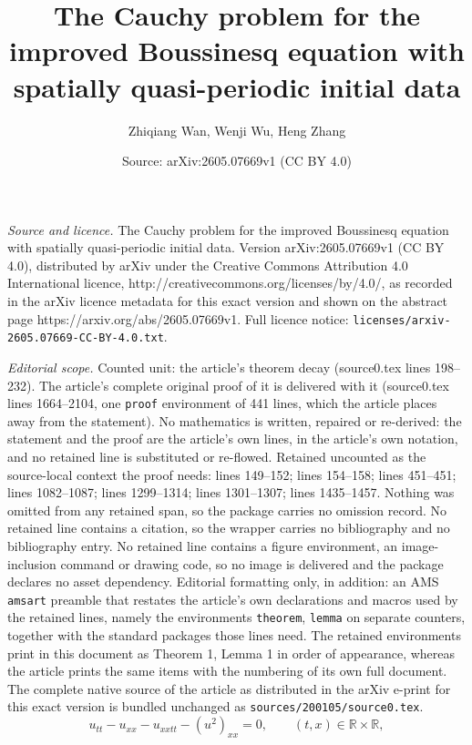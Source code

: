 \documentclass[10pt,a4paper]{amsart}
\title{The Cauchy problem for the improved Boussinesq equation with spatially quasi-periodic initial data}
\author{Zhiqiang Wan, Wenji Wu, Heng Zhang}
\date{Source: arXiv:2605.07669v1 (CC BY 4.0)}
\begin{document}
\maketitle

\noindent\emph{Source and licence.} The Cauchy problem for the improved Boussinesq equation with spatially quasi-periodic initial data. Version arXiv:2605.07669v1 (CC BY 4.0), distributed by arXiv under the Creative Commons Attribution 4.0 International licence, http://creativecommons.org/licenses/by/4.0/, as recorded in the arXiv licence metadata for this exact version and shown on the abstract page https://arxiv.org/abs/2605.07669v1. Full licence notice: \texttt{licenses/arxiv-2605.07669-CC-BY-4.0.txt}.\par\smallskip

\noindent\textit{Editorial scope.} Counted unit: the article's theorem decay (source0.tex lines 198--232). The article's complete original proof of it is delivered with it (source0.tex lines 1664--2104, one \texttt{proof} environment of 441 lines, which the article places away from the statement). No mathematics is written, repaired or re-derived: the statement and the proof are the article's own lines, in the article's own notation, and no retained line is substituted or re-flowed.  Retained uncounted as the source-local context the proof needs: lines 149--152; lines 154--158; lines 451--451; lines 1082--1087; lines 1299--1314; lines 1301--1307; lines 1435--1457.  Nothing was omitted from any retained span, so the package carries no omission record.  No retained line contains a citation, so the wrapper carries no bibliography and no bibliography entry.  No retained line contains a figure environment, an image-inclusion command or drawing code, so no image is delivered and the package declares no asset dependency.  Editorial formatting only, in addition: an AMS \texttt{amsart} preamble that restates the article's own declarations and macros used by the retained lines, namely the environments \texttt{theorem}, \texttt{lemma} on separate counters, together with the standard packages those lines need.  The retained environments print in this document as Theorem 1, Lemma 1 in order of appearance, whereas the article prints the same items with the numbering of its own full document.  The complete native source of the article as distributed in the arXiv e-print for this exact version is bundled unchanged as \texttt{sources/200105/source0.tex}.
\begin{equation}\label{eq:IBq-intro}
    u_{tt}-u_{xx}-u_{xxtt}-(u^2)_{xx}=0,
    \qquad (t,x)\in \mathbb{R}\times\mathbb{R},
\end{equation}
\end{document}
